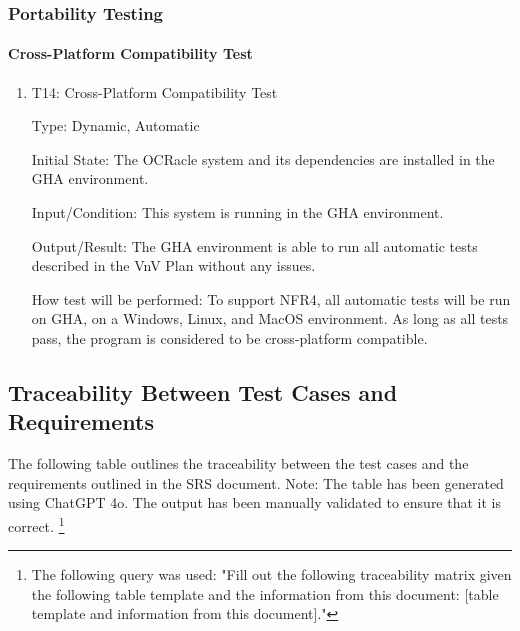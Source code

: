 \documentclass[12pt, titlepage]{article}
\begin{document}
\subsubsection{Portability Testing}

\paragraph{Cross-Platform Compatibility Test}

\begin{enumerate}

\item{T14: Cross-Platform Compatibility Test\\}

Type: Dynamic, Automatic
					
Initial State: The OCRacle system and its dependencies are installed in the
GHA environment.
					
Input/Condition: This system is running in the GHA environment.
					
Output/Result: The GHA environment is able to run all automatic tests described
in the VnV Plan without any issues.
					
How test will be performed: To support NFR4, all automatic tests will be run on
GHA, on a Windows, Linux, and MacOS environment. As long as all tests pass, the
program is considered to be cross-platform compatible.

\end{enumerate}

\subsection{Traceability Between Test Cases and Requirements}

The following table outlines the traceability between the test cases and the
requirements outlined in the SRS document. Note: The table has been generated
using ChatGPT 4o. The output has been manually validated to ensure that it is
correct. \footnote{The following query was used: "Fill out the following traceability
matrix given the following table template and the information from this document: [table template and information from this document]."}
\end{document}

